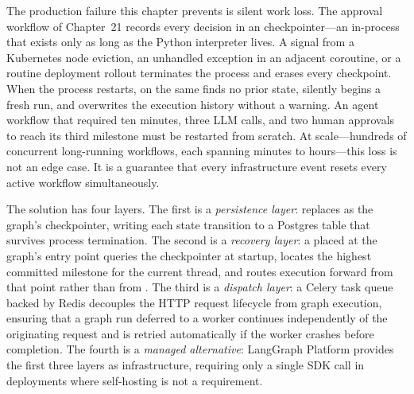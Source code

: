 

The production failure this chapter prevents is silent work loss. The
approval workflow of Chapter~21 records every decision in an
 checkpointer---an in-process 
that exists only as long as the Python interpreter lives. A 
signal from a Kubernetes node eviction, an unhandled exception in an
adjacent coroutine, or a routine deployment rollout terminates the process
and erases every checkpoint. When the process restarts, 
on the same  finds no prior state, silently begins a
fresh run, and overwrites the execution history without a warning. An
agent workflow that required ten minutes, three LLM calls, and two human
approvals to reach its third milestone must be restarted from scratch. At
scale---hundreds of concurrent long-running workflows, each spanning
minutes to hours---this loss is not an edge case. It is a guarantee that
every infrastructure event resets every active workflow simultaneously.

The solution has four layers. The first is a \emph{persistence layer}:
 replaces  as the graph's
checkpointer, writing each state transition to a Postgres table that
survives process termination. The second is a \emph{recovery layer}: a
 placed at the graph's entry point queries the
checkpointer at startup, locates the highest committed milestone for the
current thread, and routes execution forward from that point rather than
from . The third is a \emph{dispatch layer}: a Celery task
queue backed by Redis decouples the HTTP request lifecycle from graph
execution, ensuring that a graph run deferred to a worker continues
independently of the originating request and is retried automatically if
the worker crashes before completion. The fourth is a \emph{managed
alternative}: LangGraph Platform provides the first three layers as
infrastructure, requiring only a single SDK call in deployments where
self-hosting is not a requirement.


